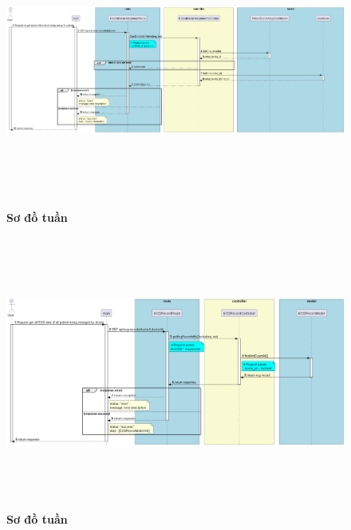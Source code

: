\documentclass{article}%
\begin{document}
\begin{figure}[H]
  \centering
  \includegraphics[width=16cm,height=9cm]{Images/server/sequence/server/getDoctorByPatient.png}
  \caption[Sơ đồ tuần tự ]{\bfseries \fontsize{12pt}{0pt}
  \selectfont Sơ đồ tuần }
  \label{hinh21} %
\end{figure}


\begin{figure}[H]
  \centering
  \includegraphics[width=16cm,height=9cm]{Images/server/sequence/server/getEcgRecordsByDoctor.png}
  \caption[Sơ đồ tuần tự ]{\bfseries \fontsize{12pt}{0pt}
  \selectfont Sơ đồ tuần }
  \label{hinh21} %
\end{figure}
\end{document}
